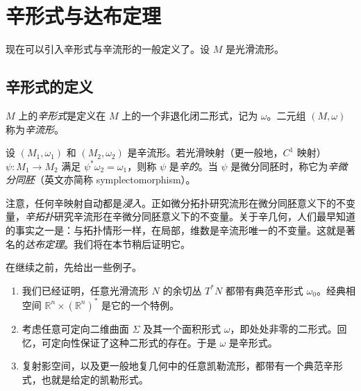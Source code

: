 \section{辛形式与达布定理}
\label{sec:symplectic-forms-darboux}

现在可以引入辛形式与辛流形的一般定义了。设 $M$ 是光滑流形。

\subsection{辛形式的定义}

\begin{definition}
\label{def:symplectic-form}
$M$ 上的\emph{辛形式}是定义在 $M$ 上的一个非退化闭二形式，记为 $\omega$。二元组 $(M,\omega)$ 称为\emph{辛流形}。
\end{definition}

\begin{definition}
\label{def:symplectic-map}
设 $(M_1,\omega_1)$ 和 $(M_2,\omega_2)$ 是辛流形。若光滑映射（更一般地，$C^1$ 映射）$\psi:M_1\to M_2$ 满足
$\psi^*\omega_2=\omega_1$，则称 $\psi$ 是\emph{辛的}。当 $\psi$ 是微分同胚时，称它为\emph{辛微分同胚}（英文亦简称 symplectomorphism）。
\end{definition}

注意，任何辛映射自动都是\emph{浸入}。正如微分拓扑研究流形在微分同胚意义下的不变量，\emph{辛拓扑}研究辛流形在辛微分同胚意义下的不变量。关于辛几何，人们最早知道的事实之一是：与拓扑情形一样，在局部，维数是辛流形唯一的不变量。这就是著名的\emph{达布定理}。我们将在本节稍后证明它。

在继续之前，先给出一些例子。

\begin{example}
\label{ex:basic-symplectic-manifolds}
\begin{enumerate}[label=(\arabic*)]
  \item 我们已经证明，任意光滑流形 $N$ 的余切丛 $T^*N$ 都带有典范辛形式 $\omega_0$。经典相空间 $\mathbb R^n\times(\mathbb R^n)^*$ 是它的一个特例。
  \item 考虑任意可定向二维曲面 $\Sigma$ 及其一个面积形式 $\omega$，即处处非零的二形式。回忆，可定向性保证了这种二形式的存在。于是 $\omega$ 是辛形式。
  \item 复射影空间，以及更一般地复几何中的任意凯勒流形，都带有一个典范辛形式，也就是给定的凯勒形式。
\end{enumerate}
\end{example}

